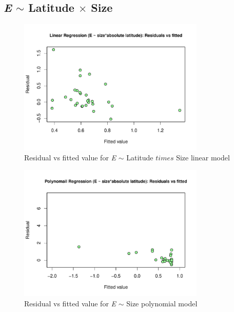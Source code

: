 \documentclass{article}
\begin{document}
\subsection{\emph{E} $\sim$ Latitude $\times$ Size}
\begin{figure}[h]
    \centering
    \includegraphics[width=3.5in]{1.pdf}
    \caption{\label{fig:S9} Residual vs fitted value for \emph{E} $\sim$ Latitude $times$ Size linear model}
\end{figure}
\begin{figure}[h]
    \centering
    \includegraphics[width=3.5in]{2.pdf}
    \caption{\label{fig:S10} Residual vs fitted value for \emph{E} $\sim$ Size polynomial model}
\end{figure}
\clearpage
\end{document}
